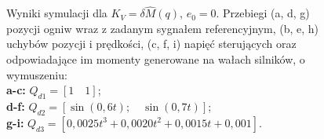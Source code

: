 \documentclass[10pt, a4paper, polish]{article}
\begin{document}
\begin{figure}[H]
{		Wyniki symulacji dla $K_V=\delta\hat{M}(q)$, $e_0=0$. Przebiegi (a, d, g) pozycji ogniw wraz z zadanym sygnałem referencyjnym, (b, e, h) uchybów pozycji i prędkości, (c, f, i)  napięć sterujących oraz odpowiadające im momenty generowane na wałach silników, o wymuszeniu:\\
		\textbf{a-c:} $Q_{d1}=[1\quad1]$;\\
		\textbf{d-f:} $Q_{d2}=[\sin(0,6t);\quad \sin(0,7t)]$;\\
		\textbf{g-i:} $Q_{d3}=[0,0025t^3+0,0020t^2+0,0015t+0,001]$.}
\end{figure}

\begin{figure}[H]
	\centering

\end{figure}
\end{document}
